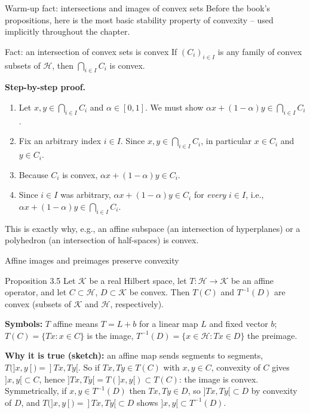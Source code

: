 \documentclass[aspectratio=169,10pt]{beamer}
\newcommand{\Hil}{\mathcal{H}}
\newcommand{\Kil}{\mathcal{K}}
\begin{document}
\begin{frame}{Warm-up fact: intersections and images of convex sets}
  Before the book's propositions, here is the most basic stability property
  of convexity -- used implicitly throughout the chapter.

  \begin{block}{Fact: an intersection of convex sets is convex}
    If $(C_i)_{i\in I}$ is any family of convex subsets of $\Hil$, then
    $\bigcap_{i\in I} C_i$ is convex.
  \end{block}

  \textbf{Step-by-step proof.}
  \begin{enumerate}
    \item Let $x,y \in \bigcap_{i\in I} C_i$ and $\alpha \in [0,1]$. We must
      show $\alpha x + (1-\alpha) y \in \bigcap_{i\in I} C_i$.
    \item Fix an arbitrary index $i\in I$. Since $x,y\in\bigcap_{i\in I}C_i$,
      in particular $x\in C_i$ and $y\in C_i$.
    \item Because $C_i$ is convex, $\alpha x + (1-\alpha)y \in C_i$.
    \item Since $i\in I$ was arbitrary, $\alpha x+(1-\alpha)y \in C_i$ for
      \emph{every} $i\in I$, i.e., $\alpha x + (1-\alpha) y \in
      \bigcap_{i\in I}C_i$. \qedhere
  \end{enumerate}
  This is exactly why, e.g., an affine subspace (an intersection of
  hyperplanes) or a polyhedron (an intersection of half-spaces) is convex.
\end{frame}

\begin{frame}{Affine images and preimages preserve convexity}
  \begin{block}{Proposition 3.5}
    Let $\Kil$ be a real Hilbert space, let $T\colon \Hil\to\Kil$ be an
    affine operator, and let $C\subset\Hil$, $D\subset\Kil$ be convex. Then
    $T(C)$ and $T^{-1}(D)$ are convex (subsets of $\Kil$ and $\Hil$,
    respectively).
  \end{block}
  \textbf{Symbols:} $T$ affine means $T = L+b$ for a linear map $L$ and fixed
  vector $b$; $T(C)=\{Tx : x\in C\}$ is the image, $T^{-1}(D)=\{x\in\Hil:
  Tx\in D\}$ the preimage.

  \textbf{Why it is true (sketch):} an affine map sends segments to segments,
  $T(]x,y[) = ]Tx,Ty[$. So if $Tx,Ty\in T(C)$ with $x,y\in C$, convexity of
  $C$ gives $]x,y[\subset C$, hence $]Tx,Ty[=T(]x,y[)\subset T(C)$: the image
  is convex. Symmetrically, if $x,y\in T^{-1}(D)$ then $Tx,Ty\in D$, so
  $]Tx,Ty[\subset D$ by convexity of $D$, and $T(]x,y[)=]Tx,Ty[\subset D$
  shows $]x,y[\subset T^{-1}(D)$.
\end{frame}
\end{document}
